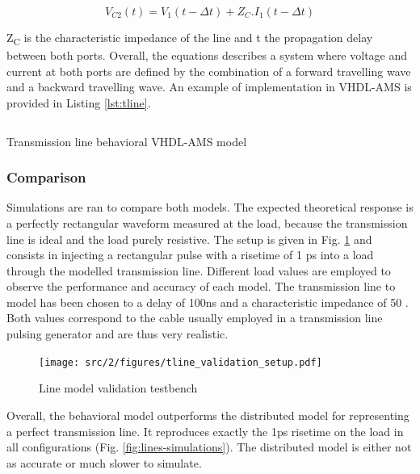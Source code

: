 \begin{equation}
V_{C2}(t) = V_{1}(t - \Delta t) + Z_{C}.I_{1}(t - \Delta t)
\label{eq:beh-line-2}
\end{equation}

Z\textsubscript{C} is the characteristic impedance of the line and \textDelta{}t the propagation delay between both ports.
Overall, the equations describes a system where voltage and current at both ports are defined by the combination of a forward travelling wave and a backward travelling wave.
An example of implementation in VHDL-AMS is provided in Listing \ref{lst:tline}.

\begin{code}
\inputminted[frame=single]{VHDL}{src/2/snippets/tline.vhdl}
\caption{Transmission line behavioral VHDL-AMS model}
\label{lst:tline}
\end{code}

\subsubsection{Comparison}

Simulations are ran to compare both models.
The expected theoretical response is a perfectly rectangular waveform measured at the load, because the transmission line is ideal and the load purely resistive.
The setup is given in Fig. \ref{fig:lines-testbench} and consists in injecting a rectangular pulse with a risetime of 1 ps into a load through the modelled transmission line.
Different load values are employed to observe the performance and accuracy of each model.
The transmission line to model has been chosen to a delay of 100ns and a characteristic impedance of 50 \textOmega.
Both values correspond to the cable usually employed in a transmission line pulsing generator and are thus very realistic.

\begin{figure}[!h]
  \centering
  \texttt{[image: src/2/figures/tline\_validation\_setup.pdf]}
  \caption{Line model validation testbench}
  \label{fig:lines-testbench}
\end{figure}

Overall, the behavioral model outperforms the distributed model for representing a perfect transmission line.
It reproduces exactly the 1ps risetime on the load in all configurations (Fig. \ref{fig:lines-simulations}).
The distributed model is either not as accurate or much slower to simulate.

